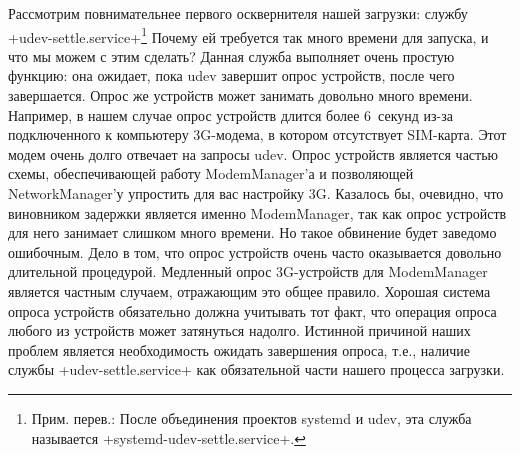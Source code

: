 \documentclass[10pt,oneside,a4paper]{article}
\begin{document}
Рассмотрим повнимательнее первого осквернителя нашей загрузки: службу
+udev-settle.service+\footnote{Прим. перев.: После объединения проектов systemd
и udev, эта служба называется +systemd-udev-settle.service+.} Почему ей
требуется так много времени для запуска, и что мы можем с этим сделать? Данная
служба выполняет очень простую функцию: она ожидает, пока udev завершит опрос
устройств, после чего завершается. Опрос же устройств может занимать довольно
много времени. Например, в нашем случае опрос устройств длится более 6~секунд
из-за подключенного к компьютеру 3G-модема, в котором отсутствует SIM-карта.
Этот модем очень долго отвечает на запросы udev.  Опрос устройств является
частью схемы, обеспечивающей работу ModemManager'а и позволяющей
NetworkManager'у упростить для вас настройку 3G. Казалось бы, очевидно, что
виновником задержки является именно ModemManager, так как опрос устройств для
него занимает слишком много времени. Но такое обвинение будет заведомо
ошибочным. Дело в том, что опрос устройств очень часто оказывается довольно
длительной процедурой. Медленный опрос 3G-устройств для ModemManager является
частным случаем, отражающим это общее правило. Хорошая система опроса устройств
обязательно должна учитывать тот факт, что операция опроса любого из устройств
может затянуться надолго. Истинной причиной наших проблем является необходимость
ожидать завершения опроса, т.е., наличие службы +udev-settle.service+ как
обязательной части нашего процесса загрузки.
\end{document}
